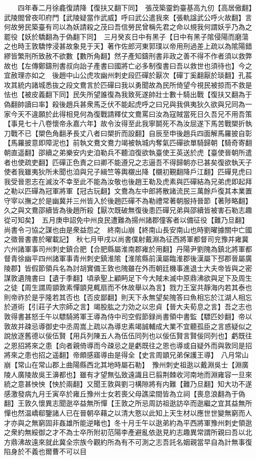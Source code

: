 　　四年春二月徐龕復請降【復扶又翻下同】　張茂築靈鈞臺基高九仞【高居傲翻】武陵閻曾夜叩府門【武陵疑當作武威】呼曰武公遣我來【張軌諡武公呼火故翻】言何故勞民築臺有司以為妖請殺之茂曰吾信勞民曾稱先君之命以規我何謂妖乎乃為之罷役【妖於驕翻為于偽翻下同】　三月癸亥日中有黑子【日中有黑子隂侵陽而磨蕩之也時王敦驕悖浸甚故象見于天】著作佐郎河東郭璞以帝用刑過差上疏以為隂陽錯繆皆繁刑所致赦不欲數【數所角翻】然子產知鑄刑書非政之善不得不作者須以救弊故也【左傳鄭鑄刑書叔向詒子產書曰國將亡必多制復書曰吾以救世也須待也】今之宜赦理亦如之　後趙中山公虎攻幽州刺史段匹磾於厭次【磾丁奚翻厭於琰翻】孔萇攻其統内諸城悉抜之段文鴦言於匹磾曰我以勇聞故為民所倚望今視民被掠而不救是怯也【被皮義翻下同】民失所望誰復為我致死遂帥壯士數十騎出戰【復扶又翻為于偽翻帥讀曰率】殺後趙兵甚衆馬乏伏不能起虎呼之曰兄與我俱夷狄久欲與兄同為一家今天不違願於此得相見何為復戰請釋仗文鴦罵曰汝為寇賊當死日久吾兄不用吾策【事見七十八卷懷帝永嘉六年】故令汝得至此我寧鬬死不為汝屈遂下馬苦戰槊折執刀戰不已【槊色角翻矛長丈八者曰槊折而設翻】自辰至申後趙兵四面解馬羅披自彰【馬羅披意即障泥也】前執文鴦文鴦力竭被執城内奪氣匹磾欲單騎歸朝【騎奇寄翻朝直遥翻】邵續之弟樂安内史洎勒兵不聽洎復欲執臺使王英送於虎【臺使晉朝所遣者也使疏吏翻】匹磾正色責之曰卿不能遵兄之志逼吾不得歸朝亦已甚矣復欲執天子使者我雖夷狄所未聞也洎與兄子緝竺等輿櫬出降【櫬初覲翻降戶江翻】匹磾見虎曰我受晉恩志在滅汝不幸至此不能為汝敬也後趙王勒及虎素與匹磾結為兄弟虎即起拜之勒以匹磾為冠軍將軍【冠古玩翻】文鴦為左中郎將散諸流民三萬餘戶復其本業置守宰以撫之於是幽冀并三州皆入於後趙匹磾不為勒禮常著朝服持晉節【著陟略翻】久之與文鴦邵續皆為後趙所殺【厭次既破無復後患匹磾兄弟與邵續皆被害石勒志趣從可知矣】　五月庚申詔免中州良民遭難為揚州諸郡僮客者以備征役【難乃旦翻】尚書令刁協之謀也由是衆益怨之　終南山崩【終南山長安南山也時劉曜據關中亡國之徵晉書書於曜載記】　秋七月甲戌以尚書僕射戴淵為征西將軍都督司兖豫并雍冀六州諸軍事司州刺史鎮合肥【合肥縣屬淮南郡雍於用翻】丹陽尹劉隗為鎮北將軍都督青徐幽平四州諸軍事青州刺史鎮淮隂【淮隂縣前漢屬臨淮郡後漢屬下邳郡晉屬廣陵郡】皆假節領兵名為討胡實備王敦也隗雖在外而朝廷機事進退士大夫帝皆與之密謀敦遺隗書曰【遺于季翻】頃承聖上顧眄足下今大賊未滅中原鼎沸欲與足下及周生之徒【周生謂周顗敦素憚顗見輒扇而不休故舉以為言】戮力王室共靜海内若其泰也則帝祚於是乎隆若其否也【否皮鄙翻】則天下永無望矣隗答曰魚相忘於江湖人相忘於道術【引莊子大宗師之言】竭股肱之力効之以忠貞【晉大夫荀息之言】吾之志也敦得書甚怒壬午以驃騎將軍王導為侍中司空假節録尚書領中書監【驃匹妙翻】帝以敦故并疎忌導御史中丞周嵩上疏以為導忠素竭誠輔成大業不宜聽孤臣之言惑疑似之說放逐舊德以佞伍賢【用兵列陳五人為伍伍同列也以佞伍賢言賢佞同列也】虧既往之恩招將來之患【向者親倚導而今疎忌之是虧既往之恩也導或自疑外而與敦同是招將來之患也招之遥翻】帝頗感寤導由是得全【史言周顗兄弟保護王導】　八月常山崩【常山在常山郡上曲陽縣西北其地時屬石勒】　豫州刺史祖逖以戴淵吳士【淵廣陵人廣陵故吳王濞都也】雖有才望無弘致遠識且已翦荆棘收河南地而淵雍容一旦來統之意甚怏怏【怏於兩翻】又聞王敦與劉刁構隙將有内難【難乃旦翻】知大功不遂感激發病九月壬寅卒於雍丘豫州士女若喪父母譙梁間皆為立祠【喪息浪翻為于偽翻】王敦久懷異志聞逖卒益無所憚【王敦之所忌周訪祖逖訪卒而逖繼之宜其益無所憚也然温嶠郗鑒諸人已在晉朝卒藉之以清大憝以此知上天生材以應世世變無窮而人才亦與之無窮固非姦雄所能逆睹也】冬十月壬午以逖弟約為平西將軍豫州刺史領逖之衆約無綏御之才不為士卒所附初范陽李產避亂依逖見約志趣異常謂所親曰吾以北方鼎沸故遠來就此冀全宗族今觀約所為有不可測之志吾託名姻親當早自為計無事復陷身於不義也爾曹不可以目